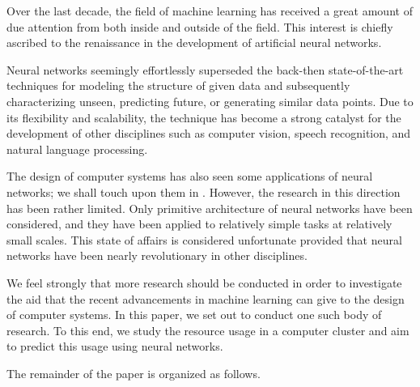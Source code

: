 Over the last decade, the field of machine learning has received a great amount
of due attention from both inside and outside of the field. This interest is
chiefly ascribed to the renaissance in the development of artificial neural
networks.

Neural networks seemingly effortlessly superseded the back-then state-of-the-art
techniques for modeling the structure of given data and subsequently
characterizing unseen, predicting future, or generating similar data points. Due
to its flexibility and scalability, the technique has become a strong catalyst
for the development of other disciplines such as computer vision, speech
recognition, and natural language processing.

The design of computer systems has also seen some applications of neural
networks; we shall touch upon them in . However, the research
in this direction has been rather limited. Only primitive architecture of neural
networks have been considered, and they have been applied to relatively simple
tasks at relatively small scales. This state of affairs is considered
unfortunate provided that neural networks have been nearly revolutionary in
other disciplines.

We feel strongly that more research should be conducted in order to investigate
the aid that the recent advancements in machine learning can give to the design
of computer systems. In this paper, we set out to conduct one such body of
research. To this end, we study the resource usage in a computer cluster and aim
to predict this usage using neural networks.

The remainder of the paper is organized as follows.

